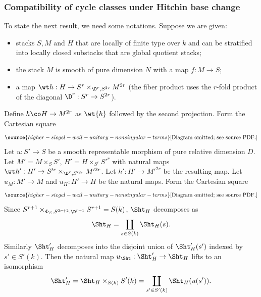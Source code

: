 \subsubsection{Compatibility of cycle classes under Hitchin base change} To state the next result, we need some notations. Suppose we are given:
\begin{itemize}
\item stacks $S,M$ and $H$ that are locally of finite type over $k$ and can be stratified  into locally closed substacks that are global quotient stacks;
\item the stack $M$ is smooth of pure dimension $N$ with a map $f:M\to S$;
\item a map $\wt h: H  \to S^r \times_{\D^r, S^{2r}}M^{2r}$ (the fiber product uses the $r$-fold product of the diagonal  $\D^{r}: S^r \to S^{2r}$).
\end{itemize}
Define $h \co H  \rightarrow M^{2r}$ as $\wt{h}$ followed by the second projection. Form the Cartesian square
\begin{equation}\label{ShtH}
\source{higher-siegel-weil-unitary-nonsingular-terms}
\text{[Diagram omitted; see source PDF.]}
\end{equation}
Let $u: S'\to S$ be a smooth representable morphism of pure relative dimension $D$. Let $M'=M\times_{S}S'$, $H'=H\times_{S^{r}}S'^{r}$ with natural maps $\wt h': H'\to S'^{r}\times_{\D^{r}, S'^{2r}}M'^{2r}$. Let $h':H'\to M'^{2r}$ be the resulting map. Let $u_{M}: M'\to M$ and $u_{H}: H'\to H$ be the natural maps. Form the Cartesian square
\begin{equation}\label{Sht'H}
\source{higher-siegel-weil-unitary-nonsingular-terms}
\text{[Diagram omitted; see source PDF.]}
\end{equation}
Since $S^{r+1}\times_{\Phi_{S}, S^{2r+2}, \D^{r+1}}S^{r+1}=S(k)$,  $\Sht_{H}$ decomposes as
\begin{equation}
\Sht_{H}=\coprod_{s\in S(k)}\Sht_{H}(s).
\end{equation}
Similarly $\Sht'_{H}$ decomposes into the disjoint union of $\Sht_{H}'(s')$ indexed by $s'\in S'(k)$.
Then the natural map $u_{\Sht}: \Sht'_{H}\to \Sht_{H}$ lifts to an isomorphism
\begin{equation}
\Sht'_{H}=\Sht_{H}\times_{S(k)}S'(k)=\coprod_{s'\in S'(k)}\Sht_{H}(u(s')).
\end{equation}



